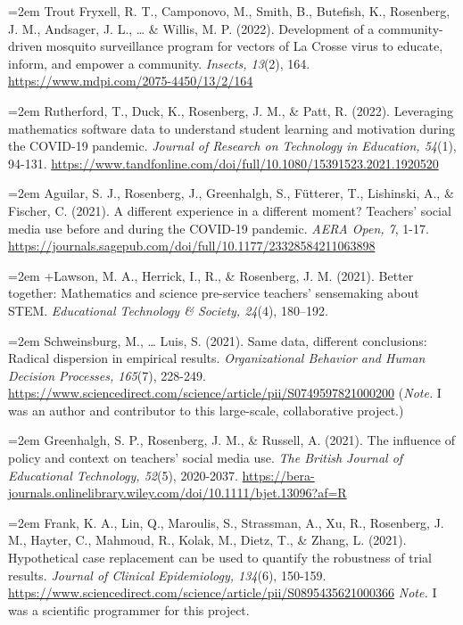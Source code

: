 \documentclass[
  14,
]{article}
\begin{document}
\hangindent=2em Trout Fryxell, R. T., Camponovo, M., Smith, B.,
Butefish, K., Rosenberg, J. M., Andsager, J. L., \ldots{} \& Willis, M.
P. (2022). Development of a community-driven mosquito surveillance
program for vectors of La Crosse virus to educate, inform, and empower a
community. \emph{Insects, 13}(2), 164.
\url{https://www.mdpi.com/2075-4450/13/2/164}

\hangindent=2em Rutherford, T., Duck, K., Rosenberg, J. M., \& Patt, R.
(2022). Leveraging mathematics software data to understand student
learning and motivation during the COVID-19 pandemic. \emph{Journal of
Research on Technology in Education, 54}(1), 94-131.
\url{https://www.tandfonline.com/doi/full/10.1080/15391523.2021.1920520}

\hangindent=2em Aguilar, S. J., Rosenberg, J., Greenhalgh, S., Fütterer,
T., Lishinski, A., \& Fischer, C. (2021). A different experience in a
different moment? Teachers' social media use before and during the
COVID-19 pandemic. \emph{AERA Open, 7}, 1-17.
\url{https://journals.sagepub.com/doi/full/10.1177/23328584211063898}

\hangindent=2em +Lawson, M. A., Herrick, I., R., \& Rosenberg, J. M.
(2021). Better together: Mathematics and science pre-service teachers'
sensemaking about STEM. \emph{Educational Technology \& Society, 24}(4),
180--192.

\hangindent=2em Schweinsburg, M., \ldots{} Luis, S. (2021). Same data,
different conclusions: Radical dispersion in empirical results.
\emph{Organizational Behavior and Human Decision Processes, 165}(7),
228-249.
\url{https://www.sciencedirect.com/science/article/pii/S0749597821000200}
(\emph{Note.} I was an author and contributor to this large-scale,
collaborative project.)

\hangindent=2em Greenhalgh, S. P., Rosenberg, J. M., \& Russell, A.
(2021). The influence of policy and context on teachers' social media
use. \emph{The British Journal of Educational Technology, 52}(5),
2020-2037.
\url{https://bera-journals.onlinelibrary.wiley.com/doi/10.1111/bjet.13096?af=R}

\hangindent=2em Frank, K. A., Lin, Q., Maroulis, S., Strassman, A., Xu,
R., Rosenberg, J. M., Hayter, C., Mahmoud, R., Kolak, M., Dietz, T., \&
Zhang, L. (2021). Hypothetical case replacement can be used to quantify
the robustness of trial results. \emph{Journal of Clinical Epidemiology,
134}(6), 150-159.
\url{https://www.sciencedirect.com/science/article/pii/S0895435621000366}
\emph{Note.} I was a scientific programmer for this project.
\end{document}
